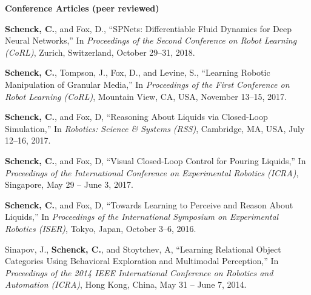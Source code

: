 \documentclass[10pt]{article}
\newcommand{\halfblankline}{\quad\vspace{-0.9\baselineskip}\pagebreak[3]}
\begin{document}
\begin{outerlist}
\halfblankline

\item[] \textbf{Conference Articles (peer reviewed)}
	\begin{innerlist}
	\item \textbf{Schenck, C.}, and Fox, D., ``SPNets: Differentiable Fluid Dynamics for Deep Neural Networks,'' In \emph{Proceedings of the Second Conference on Robot Learning (CoRL)}, Zurich, Switzerland, October 29--31, 2018.
	\item \textbf{Schenck, C.}, Tompson, J., Fox, D., and Levine, S., ``Learning Robotic Manipulation of Granular Media,'' In \emph{Proceedings of the First Conference on Robot Learning (CoRL)}, Mountain View, CA, USA, November 13--15, 2017.
	\item \textbf{Schenck, C.}, and Fox, D, ``Reasoning About Liquids via Closed-Loop Simulation,'' In \emph{Robotics: Science \& Systems (RSS)}, Cambridge, MA, USA, July 12--16, 2017.
	\item \textbf{Schenck, C.}, and Fox, D, ``Visual Closed-Loop Control for Pouring Liquids,'' In \emph{Proceedings of the International Conference on Experimental Robotics (ICRA)}, Singapore, May 29 -- June 3, 2017.
	\item \textbf{Schenck, C.}, and Fox, D, ``Towards Learning to Perceive and Reason About Liquids,'' In \emph{Proceedings of the International Symposium on Experimental Robotics (ISER)}, Tokyo, Japan, October 3--6, 2016.
	\item Sinapov, J., \textbf{Schenck, C.}, and Stoytchev, A, ``Learning Relational Object Categories Using Behavioral Exploration and Multimodal Perception,'' In \emph{Proceedings of the 2014 IEEE International Conference on Robotics and Automation (ICRA)}, Hong Kong, China, May 31 -- June 7, 2014.
	\end{innerlist}

\halfblankline


\end{outerlist}
\end{document}
